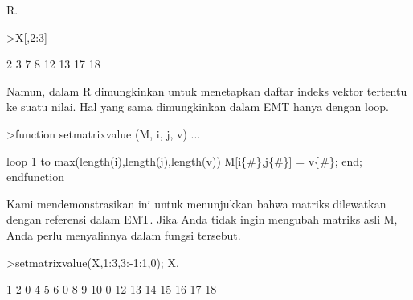 \documentclass[a4paper,10pt]{article}
\begin{document}
\begin{eulernotebook}
\begin{eulercomment}
\begin{eulercomment}
\begin{eulercomment}
\begin{eulercomment}
\begin{eulercomment}
\begin{eulercomment}
\begin{eulercomment}
\begin{eulercomment}
\begin{eulercomment}
\begin{eulercomment}
\begin{eulercomment}
\begin{eulercomment}
\begin{eulercomment}
\begin{eulercomment}
\begin{eulercomment}
\begin{eulercomment}
\begin{eulercomment}
\begin{eulercomment}
\begin{eulercomment}
\begin{eulercomment}
\begin{eulercomment}
\begin{eulercomment}
\begin{eulercomment}
\begin{eulercomment}
\begin{eulercomment}
\begin{eulercomment}
\begin{eulercomment}
\begin{eulercomment}
\begin{eulercomment}
\begin{eulercomment}
\begin{eulercomment}
\begin{eulercomment}
\begin{eulercomment}
\begin{eulercomment}
\begin{eulercomment}
\begin{eulercomment}
\begin{eulercomment}
\begin{eulercomment}
\begin{eulercomment}
\begin{eulercomment}
\begin{eulercomment}
\begin{eulercomment}
\begin{eulercomment}
\begin{eulercomment}
\begin{eulercomment}
\begin{eulercomment}
\begin{eulercomment}
\begin{eulercomment}
\begin{eulercomment}
\begin{eulercomment}
\begin{eulercomment}
\begin{eulercomment}
\begin{eulercomment}
\begin{eulercomment}
\begin{eulercomment}
\begin{eulercomment}
\begin{eulercomment}
\begin{eulercomment}
\begin{eulercomment}
\begin{eulercomment}
\begin{eulercomment}
\begin{eulercomment}
\begin{eulercomment}
\begin{eulercomment}
\begin{eulercomment}
\begin{eulercomment}
\begin{eulercomment}
\begin{eulercomment}
\begin{eulercomment}
R.
\end{eulercomment}
\begin{eulerprompt}
>X[,2:3]
\end{eulerprompt}
\begin{euleroutput}
          2         3 
          7         8 
         12        13 
         17        18 
\end{euleroutput}
\begin{eulercomment}
Namun, dalam R dimungkinkan untuk menetapkan daftar indeks vektor
tertentu ke suatu nilai. Hal yang sama dimungkinkan dalam EMT hanya
dengan loop.
\end{eulercomment}
\begin{eulerprompt}
>function setmatrixvalue (M, i, j, v) ...
\end{eulerprompt}
\begin{eulerudf}
  loop 1 to max(length(i),length(j),length(v))
     M[i\{#\},j\{#\}] = v\{#\};
  end;
  endfunction
\end{eulerudf}
\begin{eulercomment}
Kami mendemonstrasikan ini untuk menunjukkan bahwa matriks dilewatkan
dengan referensi dalam EMT. Jika Anda tidak ingin mengubah matriks
asli M, Anda perlu menyalinnya dalam fungsi tersebut.
\end{eulercomment}
\begin{eulerprompt}
>setmatrixvalue(X,1:3,3:-1:1,0); X,
\end{eulerprompt}
\begin{euleroutput}
          1         2         0         4         5 
          6         0         8         9        10 
          0        12        13        14        15 
         16        17        18    
\end{euleroutput}
\end{eulercomment}
\end{eulercomment}
\end{eulercomment}
\end{eulercomment}
\end{eulercomment}
\end{eulercomment}
\end{eulercomment}
\end{eulercomment}
\end{eulercomment}
\end{eulercomment}
\end{eulercomment}
\end{eulercomment}
\end{eulercomment}
\end{eulercomment}
\end{eulercomment}
\end{eulercomment}
\end{eulercomment}
\end{eulercomment}
\end{eulercomment}
\end{eulercomment}
\end{eulercomment}
\end{eulercomment}
\end{eulercomment}
\end{eulercomment}
\end{eulercomment}
\end{eulercomment}
\end{eulercomment}
\end{eulercomment}
\end{eulercomment}
\end{eulercomment}
\end{eulercomment}
\end{eulercomment}
\end{eulercomment}
\end{eulercomment}
\end{eulercomment}
\end{eulercomment}
\end{eulercomment}
\end{eulercomment}
\end{eulercomment}
\end{eulercomment}
\end{eulercomment}
\end{eulercomment}
\end{eulercomment}
\end{eulercomment}
\end{eulercomment}
\end{eulercomment}
\end{eulercomment}
\end{eulercomment}
\end{eulercomment}
\end{eulercomment}
\end{eulercomment}
\end{eulercomment}
\end{eulercomment}
\end{eulercomment}
\end{eulercomment}
\end{eulercomment}
\end{eulercomment}
\end{eulercomment}
\end{eulercomment}
\end{eulercomment}
\end{eulercomment}
\end{eulercomment}
\end{eulercomment}
\end{eulercomment}
\end{eulercomment}
\end{eulercomment}
\end{eulercomment}
\end{eulercomment}
\end{eulernotebook}
\end{document}
